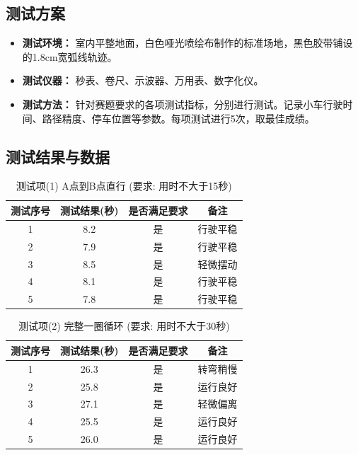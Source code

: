 \documentclass[UTF8]{ctexart}
\begin{document}
\subsection{测试方案}

\begin{itemize}
    \item \textbf{测试环境：} 室内平整地面，白色哑光喷绘布制作的标准场地，黑色胶带铺设的1.8cm宽弧线轨迹。
    \item \textbf{测试仪器：} 秒表、卷尺、示波器、万用表、数字化仪。
    \item \textbf{测试方法：} 针对赛题要求的各项测试指标，分别进行测试。记录小车行驶时间、路径精度、停车位置等参数。每项测试进行5次，取最佳成绩。
\end{itemize}

\subsection{测试结果与数据}

\begin{table}[H]
    \centering
    \caption{测试项(1) A点到B点直行 (要求: 用时不大于15秒)}
    \label{tab:task1}
    \begin{tabular}{cccc}
        \toprule
        测试序号 & 测试结果(秒) & 是否满足要求 & 备注 \\
        \midrule
        1 & 8.2 & 是 & 行驶平稳 \\
        2 & 7.9 & 是 & 行驶平稳 \\
        3 & 8.5 & 是 & 轻微摆动 \\
        4 & 8.1 & 是 & 行驶平稳 \\
        5 & 7.8 & 是 & 行驶平稳 \\
        \bottomrule
    \end{tabular}
\end{table}

\begin{table}[H]
    \centering
    \caption{测试项(2) 完整一圈循环 (要求: 用时不大于30秒)}
    \label{tab:task2}
    \begin{tabular}{cccc}
        \toprule
        测试序号 & 测试结果(秒) & 是否满足要求 & 备注 \\
        \midrule
        1 & 26.3 & 是 & 转弯稍慢 \\
        2 & 25.8 & 是 & 运行良好 \\
        3 & 27.1 & 是 & 轻微偏离 \\
        4 & 25.5 & 是 & 运行良好 \\
        5 & 26.0 & 是 & 运行良好 \\
        \bottomrule
    \end{tabular}
\end{table}
\end{document}
